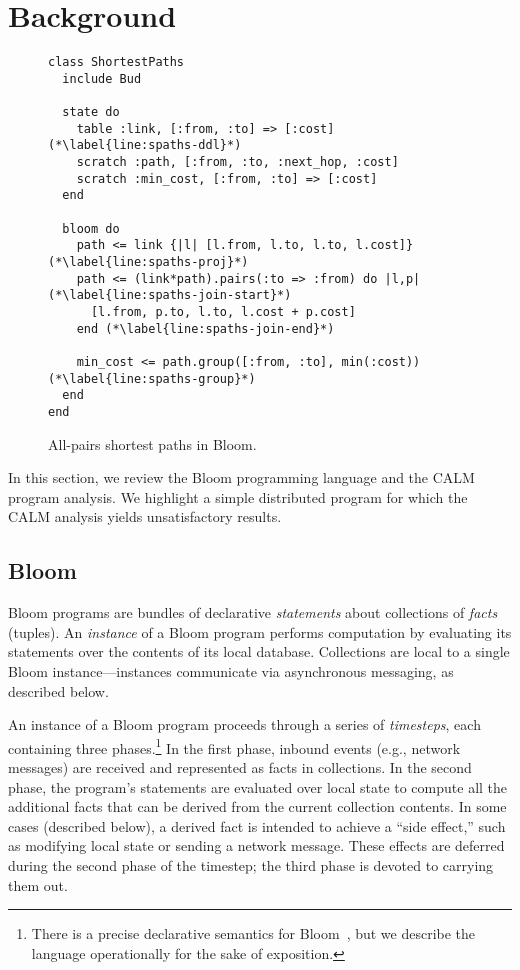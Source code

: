\section{Background}
\label{sec:background}

\begin{figure}[t]
\begin{scriptsize}
\begin{lstlisting}
class ShortestPaths
  include Bud

  state do
    table :link, [:from, :to] => [:cost] (*\label{line:spaths-ddl}*)
    scratch :path, [:from, :to, :next_hop, :cost]
    scratch :min_cost, [:from, :to] => [:cost]
  end

  bloom do
    path <= link {|l| [l.from, l.to, l.to, l.cost]} (*\label{line:spaths-proj}*)
    path <= (link*path).pairs(:to => :from) do |l,p| (*\label{line:spaths-join-start}*)
      [l.from, p.to, l.to, l.cost + p.cost]
    end (*\label{line:spaths-join-end}*)

    min_cost <= path.group([:from, :to], min(:cost)) (*\label{line:spaths-group}*)
  end
end
\end{lstlisting}
\end{scriptsize}
\caption{All-pairs shortest paths in Bloom.}
\label{fig:bloom-spaths}
\end{figure}

In this section, we review the Bloom programming language and the CALM program
analysis.  We highlight a simple distributed program for which the CALM analysis
yields unsatisfactory results.

\subsection{Bloom}
\label{sec:bg-bloom}

Bloom programs are bundles of declarative \emph{statements} about collections of
\emph{facts} (tuples). An \emph{instance} of a Bloom program performs
computation by evaluating its statements over the contents of its local
database. Collections are local to a single Bloom instance---instances
communicate via asynchronous messaging, as described below.

An instance of a Bloom program proceeds through a series of \emph{timesteps},
each containing three phases.\footnote{There is a precise declarative semantics
  for Bloom~\cite{dedalus}, but we describe the language operationally for the
  sake of exposition.} In the first phase, inbound events (e.g., network
messages) are received and represented as facts in collections. In the second
phase, the program's statements are evaluated over local state to compute all
the additional facts that can be derived from the current collection
contents. In some cases (described below), a derived fact is intended to achieve
a ``side effect,'' such as modifying local state or sending a network message.
These effects are deferred during the second phase of the timestep; the third
phase is devoted to carrying them out.


